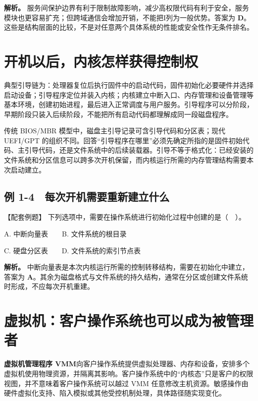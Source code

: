\textbf{解析。} 服务间保护边界有利于限制故障影响，减少高权限代码有利于安全，服务模块也更容易扩充；但跨域通信会增加开销，不能把\ensuremath{\mathrm{I}}列为一般优势。答案为 \textbf{D}。这些是结构层面的比较，不是对任意两个具体系统的性能或安全性作无条件排名。

\section{开机以后，内核怎样获得控制权}\label{OS01-1-9}

典型引导链为：处理器复位后执行固件中的启动代码，固件初始化必要硬件并选择启动设备；引导程序定位并装入内核；内核建立中断入口、内存管理和设备管理等基本环境，创建初始进程，最后进入正常调度与用户服务。引导程序可以分阶段，早期阶段只装入后续阶段，不能把所有启动代码都理解成同一段磁盘程序。

传统 BIOS/MBR 模型中，磁盘主引导记录可含引导代码和分区表；现代 UEFI/GPT 的组织不同。回答``引导程序在哪里''必须先确定所指的是固件初始代码、主引导代码，还是文件系统中的后续装载器。引导不等于格式化：已经安装的文件系统和分区信息可以跨多次开机保留，而内核运行所需的内存管理结构需要本次启动建立。

\subsection{例 1-4　每次开机需要重新建立什么}\label{OS01-ex1-4}

{\begin{example}[配套例题]

【配套例题】 下列选项中，需要在操作系统进行初始化过程中创建的是（　）。

A. 中断向量表　　B. 文件系统的根目录

C. 硬盘分区表　　D. 文件系统的索引节点表

\end{example}}

\textbf{解析。} 中断向量表是本次内核运行所需的控制转移结构，需要在初始化中建立，答案为 \textbf{A}。其余为磁盘格式与文件系统的持久结构，通常在分区或创建文件系统时形成，不应每次开机重建。

\section{虚拟机：客户操作系统也可以成为被管理者}\label{OS01-1-10}

\textbf{虚拟机管理程序 VMM}向客户操作系统提供虚拟处理器、内存和设备，安排多个虚拟机使用物理资源，并隔离其影响。客户操作系统中的``内核态''只是客户的权限视图，并不意味着客户操作系统可以越过 VMM 任意修改主机资源。敏感操作由硬件虚拟化支持、陷入模拟或其他受控机制处理，具体路径随实现变化。

